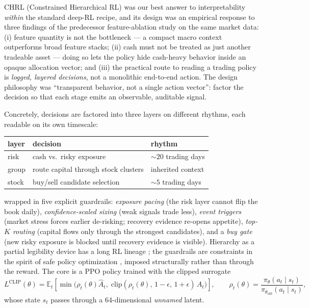 \documentclass[11pt]{article}
\newcommand{\E}{\mathbb{E}}
\begin{document}
CHRL (Constrained Hierarchical RL) was our best answer to interpretability \emph{within} the
standard deep-RL recipe, and its design was an empirical response to three findings of the
predecessor feature-ablation study on the same market data: (i) feature quantity is not the
bottleneck --- a compact macro context outperforms broad feature stacks; (ii) cash must not be
treated as just another tradeable asset --- doing so lets the policy hide cash-heavy behavior
inside an opaque allocation vector; and (iii) the practical route to reading a trading policy is
\emph{logged, layered decisions}, not a monolithic end-to-end action. The design philosophy was
``transparent behavior, not a single action vector'': factor the decision so that each stage
emits an observable, auditable signal.

Concretely, decisions are factored into three layers on different rhythms, each readable on its
own timescale:
\begin{center}\small
\begin{tabular}{lll}
\toprule
layer & decision & rhythm \\
\midrule
risk & cash vs.\ risky exposure & ${\sim}20$ trading days \\
group & route capital through stock clusters & inherited context \\
stock & buy/sell candidate selection & ${\sim}5$ trading days \\
\bottomrule
\end{tabular}
\end{center}
wrapped in five explicit guardrails: \emph{exposure pacing} (the risk layer cannot flip the book
daily), \emph{confidence-scaled sizing} (weak signals trade less), \emph{event triggers} (market
stress forces earlier de-risking; recovery evidence re-opens appetite), \emph{top-$K$ routing}
(capital flows only through the strongest candidates), and a \emph{buy gate} (new risky exposure
is blocked until recovery evidence is visible). Hierarchy as a partial legibility device has a
long RL lineage \citep{sutton1999options,bacon2017option}; the guardrails are constraints in the
spirit of safe policy optimization \citep{achiam2017}, imposed structurally rather than through
the reward. The core is a PPO policy \citep{schulman2017ppo} trained with the clipped surrogate
\begin{equation}
L^{\text{CLIP}}(\theta) = \E_t\!\left[\min\!\big(\rho_t(\theta)\hat{A}_t,\;
\text{clip}(\rho_t(\theta),\,1{-}\epsilon,\,1{+}\epsilon)\,\hat{A}_t\big)\right],
\qquad \rho_t(\theta) = \frac{\pi_\theta(a_t \mid s_t)}{\pi_{\theta_{\text{old}}}(a_t \mid s_t)},
\label{eq:ppo}
\end{equation}
whose state $s_t$ passes through a 64-dimensional \emph{unnamed} latent.
\end{document}
